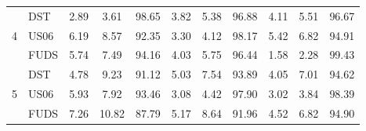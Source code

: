 \begin{table*}[htbp]
{\begin{tabular}{ c| l| c c c| c c c |c c c}
    \hline
      & DST & 2.89 & 3.61 & 98.65 & 3.82 & 5.38 & 96.88 & 4.11 & 5.51 & 96.67 \\ 
    4 & US06 & 6.19 & 8.57 & 92.35 & 3.30 & 4.12 & 98.17 & 5.42 & 6.82 & 94.91 \\ 
      & FUDS & 5.74 & 7.49 & 94.16 & 4.03 & 5.75 & 96.44 & 1.58 & 2.28 & 99.43 \\ 
    \hline
      & DST & 4.78 & 9.23 & 91.12 & 5.03 & 7.54 & 93.89 & 4.05 & 7.01 & 94.62 \\ 
    5 & US06 & 5.93 & 7.92 & 93.46 & 3.08 & 4.42 & 97.90 & 3.02 & 3.84 & 98.39 \\ 
      & FUDS & 7.26 & 10.82 & 87.79 & 5.17 & 8.64 & 91.96 & 4.52 & 6.82 & 94.90 \\ 

    

\end{tabular}}
\end{table*}
